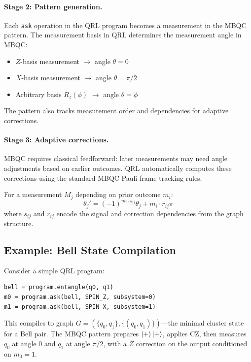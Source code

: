 \documentclass[submission,copyright,creativecommons]{eptcs}
\newcommand{\qrl}{\textsc{QRL}}
\newcommand{\mbqc}{\textsc{MBQC}}
\begin{document}
\paragraph{Stage 2: Pattern generation.}
Each \texttt{ask} operation in the \qrl{} program becomes a measurement in
the \mbqc{} pattern. The measurement basis in \qrl{} determines the
measurement angle in \mbqc{}:

\begin{itemize}
    \item $Z$-basis measurement $\rightarrow$ angle $\theta = 0$
    \item $X$-basis measurement $\rightarrow$ angle $\theta = \pi/2$
    \item Arbitrary basis $R_z(\phi)$ $\rightarrow$ angle $\theta = \phi$
\end{itemize}

The pattern also tracks measurement order and dependencies for adaptive
corrections.

\paragraph{Stage 3: Adaptive corrections.}
\mbqc{} requires classical feedforward: later measurements may need angle
adjustments based on earlier outcomes. \qrl{} automatically computes these
corrections using the standard \mbqc{} Pauli frame tracking rules.

For a measurement $M_j$ depending on prior outcome $m_i$:
\begin{equation}
\theta_j' = (-1)^{m_i \cdot s_{ij}} \theta_j + m_i \cdot r_{ij} \pi
\end{equation}
where $s_{ij}$ and $r_{ij}$ encode the signal and correction dependencies
from the graph structure.

\subsection{Example: Bell State Compilation}

Consider a simple \qrl{} program:

\begin{lstlisting}
bell = program.entangle(q0, q1)
m0 = program.ask(bell, SPIN_Z, subsystem=0)
m1 = program.ask(bell, SPIN_X, subsystem=1)
\end{lstlisting}

This compiles to graph $G = (\{q_0, q_1\}, \{(q_0, q_1)\})$---the minimal
cluster state for a Bell pair. The \mbqc{} pattern prepares $\ket{+}\ket{+}$,
applies CZ, then measures $q_0$ at angle 0 and $q_1$ at angle $\pi/2$, with
a $Z$ correction on the output conditioned on $m_0 = 1$.
\end{document}
